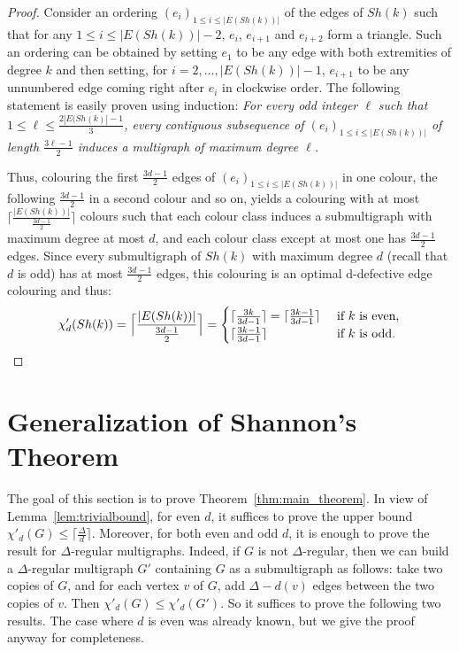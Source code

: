 \begin{proof}
Consider an ordering $(e_i)_{1 \leq i \leq |E(Sh(k))|}$ of the edges of $Sh(k)$ such that for any $1 \leq i \leq |E(Sh(k))| - 2$, $e_i$, $e_{i+1}$ and $e_{i+2}$ form a triangle. 
Such an ordering can be obtained by setting $e_{1}$ to be any edge with both extremities of degree $k$ and then setting, for $i=2, \dots, |E(Sh(k))| - 1$, $e_{i+1}$ to be any unnumbered edge coming right after $e_{i}$ in clockwise order. 
The following statement is easily proven using induction:
\emph{
    For every odd integer $\ell$ such that $1 \leq \ell \leq \frac{2|E(Sh(k)|-1}{3}$, every contiguous subsequence of $(e_{i})_{1 \leq i \leq |E(Sh(k))|}$ of length $\frac{3\ell - 1}{2}$ induces a multigraph of maximum degree $\ell$.
}

Thus, colouring the first $\frac{3d-1}{2}$ edges of $(e_i)_{1 \leq i \leq |E(Sh(k))|}$ in one colour, the following $\frac{3d-1}{2}$ in a second colour and so on, yields a colouring with at most $\lceil \frac{|E(Sh(k))|}{\frac{3d-1}{2}} \rceil$ colours such that each colour class induces a submultigraph with maximum degree at most $d$, and each colour class except at most one has $\frac{3d-1}{2}$ edges. Since every submultigraph of $Sh(k)$ with maximum degree $d$ (recall that $d$ is odd) has at most $\frac{3d-1}{2}$ edges, this colouring is an optimal d-defective edge colouring and thus: 
\[ \chi'_d(Sh(k)) = \Bigl\lceil \frac{|E(Sh(k))|}{\frac{3d-1}{2}} \Bigr\rceil = 
  \begin{cases}
     \lceil \frac{3k}{3d-1} \rceil = \lceil \frac{3k-1}{3d-1} \rceil   & \text{ if } k \text{ is even,} \\
     \lceil \frac{3k-1}{3d-1} \rceil & \text{ if } k \text{ is odd.}
  \end{cases}
\]
\end{proof}



\section{Generalization of Shannon's Theorem} \label{sec:multi}


The goal of this section is to prove Theorem~\ref{thm:main_theorem}. In view of Lemma~\ref{lem:trivialbound}, for even $d$, it suffices to prove the upper bound $\chi'_d(G) \leq \lceil \frac{\Delta}{d} \rceil$. Moreover, for both even and odd $d$, it is enough to prove the result for $\Delta$-regular multigraphs. Indeed, if $G$ is not $\Delta$-regular, then we can build a $\Delta$-regular multigraph $G'$ containing $G$ as a submultigraph  as follows: take two copies of $G$, and for each vertex $v$ of $G$, add $\Delta -d(v)$ edges between the two copies of $v$. Then $\chi'_{d}(G) \leq \chi'_{d}(G')$. So it suffices to prove the following two results. The case where $d$ is even was already known, but we give the proof anyway for completeness. 

